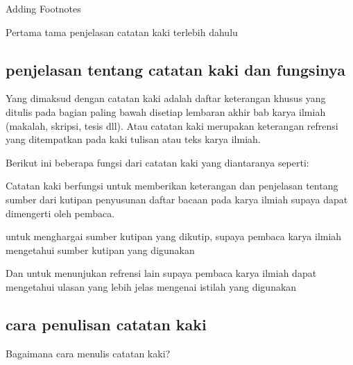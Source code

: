 
\sloppy


{\fontsize{14pt}{14pt}\selectfont Adding Footnotes}

\vspace{\baselineskip}
 Pertama tama penjelasan catatan kaki terlebih dahulu\par

\vspace{\baselineskip}
\subsection{penjelasan tentang catatan kaki dan fungsinya}

\vspace{\baselineskip}
Yang dimaksud dengan catatan kaki adalah daftar keterangan khusus yang ditulis pada bagian paling bawah disetiap lembaran akhir bab karya ilmiah (makalah, skripsi, tesis dll). Atau catatan kaki merupakan keterangan refrensi yang ditempatkan pada kaki tulisan atau teks karya ilmiah.\par

\vspace{\baselineskip}
Berikut ini beberapa fungsi dari catatan kaki yang diantaranya seperti:\par


\vspace{\baselineskip}
\noindent Catatan kaki berfungsi untuk memberikan keterangan dan penjelasan tentang sumber dari kutipan penyusunan daftar bacaan pada karya ilmiah supaya dapat dimengerti oleh pembaca.\par

\vspace{\baselineskip}
\noindent untuk menghargai sumber kutipan yang dikutip, supaya pembaca karya ilmiah mengetahui sumber kutipan yang digunakan\par

\vspace{\baselineskip}
\noindent Dan untuk menunjukan refrensi lain supaya pembaca karya ilmiah dapat mengetahui ulasan yang lebih jelas mengenai istilah yang digunakan\par

\vspace{\baselineskip}
\subsection{cara penulisan catatan kaki}

\vspace{\baselineskip}
\noindent Bagaimana cara menulis catatan kaki?\par

